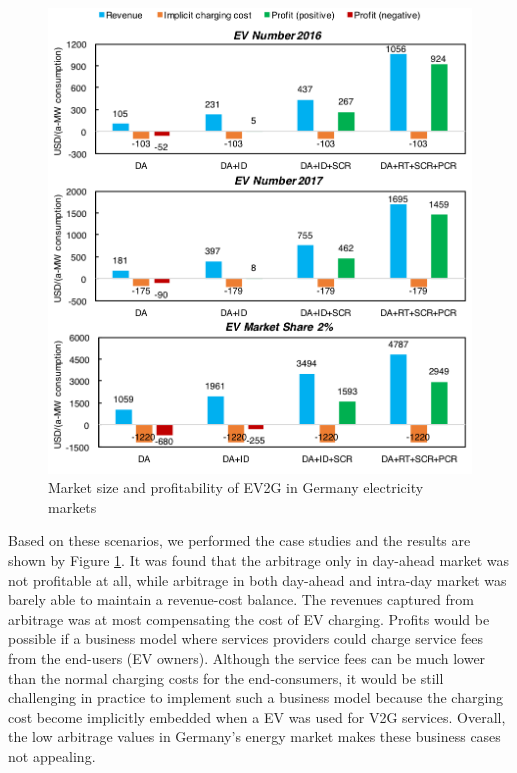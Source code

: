 \begin{figure}[h!]
	\centering
	\includegraphics[width=0.95\linewidth]{Figures/Germany_EV_profit}
	\caption{Market size and profitability of EV2G in Germany electricity markets}
	\label{fig:Germany_EV}
\end{figure}

Based on these scenarios, we performed the case studies and the results are shown by Figure \ref{fig:Germany_EV}. It was found that the arbitrage only in day-ahead market was not profitable at all, while arbitrage in both day-ahead and intra-day market was barely able to maintain a revenue-cost balance. The revenues captured from arbitrage was at most compensating the cost of EV charging. Profits would be possible if a business model where services providers could charge service fees from the end-users (EV owners). Although the service fees can be much lower than the normal charging costs for the end-consumers, it would be still challenging in practice to implement such a business model because the charging cost become implicitly embedded when a EV was used for V2G services. Overall, the low arbitrage values in Germany's energy market makes these business cases not appealing. 

